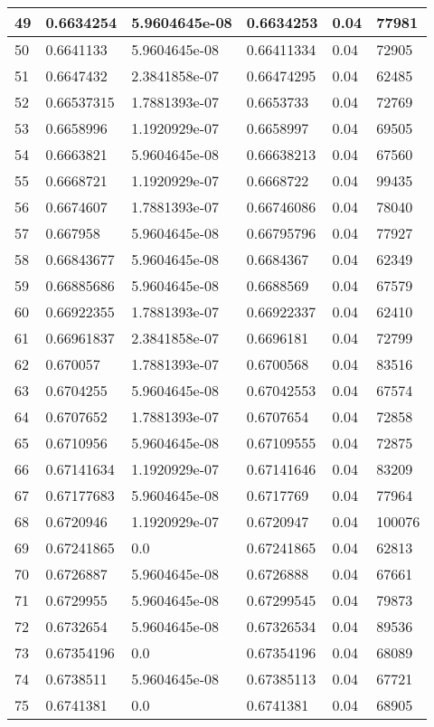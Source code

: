 \begin{longtable}{|l|l|l|l|l|l|}
49 & 0.6634254 & 5.9604645e-08 & 0.6634253 & 0.04 & 77981 \\ \hline 
50 & 0.6641133 & 5.9604645e-08 & 0.66411334 & 0.04 & 72905 \\ \hline 
51 & 0.6647432 & 2.3841858e-07 & 0.66474295 & 0.04 & 62485 \\ \hline 
52 & 0.66537315 & 1.7881393e-07 & 0.6653733 & 0.04 & 72769 \\ \hline 
53 & 0.6658996 & 1.1920929e-07 & 0.6658997 & 0.04 & 69505 \\ \hline 
54 & 0.6663821 & 5.9604645e-08 & 0.66638213 & 0.04 & 67560 \\ \hline 
55 & 0.6668721 & 1.1920929e-07 & 0.6668722 & 0.04 & 99435 \\ \hline 
56 & 0.6674607 & 1.7881393e-07 & 0.66746086 & 0.04 & 78040 \\ \hline 
57 & 0.667958 & 5.9604645e-08 & 0.66795796 & 0.04 & 77927 \\ \hline 
58 & 0.66843677 & 5.9604645e-08 & 0.6684367 & 0.04 & 62349 \\ \hline 
59 & 0.66885686 & 5.9604645e-08 & 0.6688569 & 0.04 & 67579 \\ \hline 
60 & 0.66922355 & 1.7881393e-07 & 0.66922337 & 0.04 & 62410 \\ \hline 
61 & 0.66961837 & 2.3841858e-07 & 0.6696181 & 0.04 & 72799 \\ \hline 
62 & 0.670057 & 1.7881393e-07 & 0.6700568 & 0.04 & 83516 \\ \hline 
63 & 0.6704255 & 5.9604645e-08 & 0.67042553 & 0.04 & 67574 \\ \hline 
64 & 0.6707652 & 1.7881393e-07 & 0.6707654 & 0.04 & 72858 \\ \hline 
65 & 0.6710956 & 5.9604645e-08 & 0.67109555 & 0.04 & 72875 \\ \hline 
66 & 0.67141634 & 1.1920929e-07 & 0.67141646 & 0.04 & 83209 \\ \hline 
67 & 0.67177683 & 5.9604645e-08 & 0.6717769 & 0.04 & 77964 \\ \hline 
68 & 0.6720946 & 1.1920929e-07 & 0.6720947 & 0.04 & 100076 \\ \hline 
69 & 0.67241865 & 0.0 & 0.67241865 & 0.04 & 62813 \\ \hline 
70 & 0.6726887 & 5.9604645e-08 & 0.6726888 & 0.04 & 67661 \\ \hline 
71 & 0.6729955 & 5.9604645e-08 & 0.67299545 & 0.04 & 79873 \\ \hline 
72 & 0.6732654 & 5.9604645e-08 & 0.67326534 & 0.04 & 89536 \\ \hline 
73 & 0.67354196 & 0.0 & 0.67354196 & 0.04 & 68089 \\ \hline 
74 & 0.6738511 & 5.9604645e-08 & 0.67385113 & 0.04 & 67721 \\ \hline 
75 & 0.6741381 & 0.0 & 0.6741381 & 0.04 & 68905 \\ \hline 
\end{longtable}